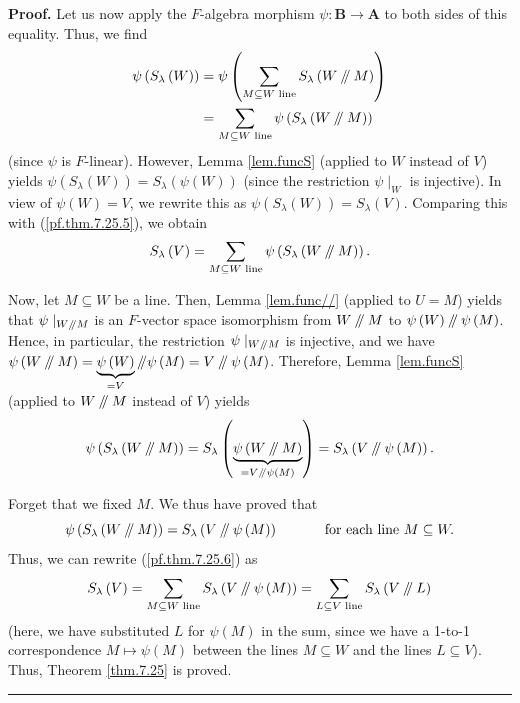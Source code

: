 \documentclass[numbers=enddot,12pt,final,onecolumn,notitlepage]{scrartcl}%
\numberwithin{exer}{section}
\theoremstyle{definition}
\newenvironment{proof}[1][Proof]{\noindent\textbf{#1.} }{\ \rule{0.5em}{0.5em}}
\let\sumnonlimits\sum
\renewcommand{\sum}{\sumnonlimits\limits}
\newcommand{\sslash}{\mathbin{/\mkern-5mu/}}
\theoremstyle{plainsl}
\begin{document}
\begin{proof}
Let us now apply the $F$-algebra morphism $\psi:\mathbf{B}\rightarrow
\mathbf{A}$ to both sides of this equality. Thus, we find%
\begin{align}
\psi\left(  S_{\lambda}\left(  W\right)  \right)   &  =\psi\left(
\sum_{M\subseteq W\text{ line}}S_{\lambda}\left(  W\sslash M\right)  \right)
\nonumber\\
&  =\sum_{M\subseteq W\text{ line}}\psi\left(  S_{\lambda}\left(
W\sslash M\right)  \right)  \label{pf.thm.7.25.5}%
\end{align}
(since $\psi$ is $F$-linear). However, Lemma \ref{lem.funcS} (applied to $W$
instead of $V$) yields $\psi\left(  S_{\lambda}\left(  W\right)  \right)
=S_{\lambda}\left(  \psi\left(  W\right)  \right)  $ (since the restriction
$\psi\mid_{W}$ is injective). In view of $\psi\left(  W\right)  =V$, we
rewrite this as $\psi\left(  S_{\lambda}\left(  W\right)  \right)
=S_{\lambda}\left(  V\right)  $. Comparing this with (\ref{pf.thm.7.25.5}), we
obtain%
\begin{equation}
S_{\lambda}\left(  V\right)  =\sum_{M\subseteq W\text{ line}}\psi\left(
S_{\lambda}\left(  W\sslash M\right)  \right)  . \label{pf.thm.7.25.6}%
\end{equation}


Now, let $M\subseteq W$ be a line. Then, Lemma \ref{lem.func//} (applied to
$U=M$) yields that $\psi\mid_{W\sslash M}$ is an $F$-vector space isomorphism
from $W\sslash M$ to $\psi\left(  W\right)  \sslash\psi\left(  M\right)  $.
Hence, in particular, the restriction $\psi\mid_{W\sslash M}$ is injective,
and we have $\psi\left(  W\sslash M\right)  =\underbrace{\psi\left(  W\right)
}_{=V}\sslash\psi\left(  M\right)  =V\sslash\psi\left(  M\right)  $.
Therefore, Lemma \ref{lem.funcS} (applied to $W\sslash M$ instead of $V$)
yields
\[
\psi\left(  S_{\lambda}\left(  W\sslash M\right)  \right)  =S_{\lambda}\left(
\underbrace{\psi\left(  W\sslash M\right)  }_{=V\sslash\psi\left(  M\right)
}\right)  =S_{\lambda}\left(  V\sslash\psi\left(  M\right)  \right)  .
\]


Forget that we fixed $M$. We thus have proved that
\[
\psi\left(  S_{\lambda}\left(  W\sslash M\right)  \right)  =S_{\lambda}\left(
V\sslash\psi\left(  M\right)  \right)  \ \ \ \ \ \ \ \ \ \ \text{for each line
}M\subseteq W.
\]
Thus, we can rewrite (\ref{pf.thm.7.25.6}) as%
\[
S_{\lambda}\left(  V\right)  =\sum_{M\subseteq W\text{ line}}S_{\lambda
}\left(  V\sslash\psi\left(  M\right)  \right)  =\sum_{L\subseteq V\text{
line}}S_{\lambda}\left(  V\sslash L\right)
\]
(here, we have substituted $L$ for $\psi\left(  M\right)  $ in the sum, since
we have a 1-to-1 correspondence $M\mapsto\psi\left(  M\right)  $ between the
lines $M\subseteq W$ and the lines $L\subseteq V$). Thus, Theorem
\ref{thm.7.25} is proved.
\end{proof}
\end{document}
